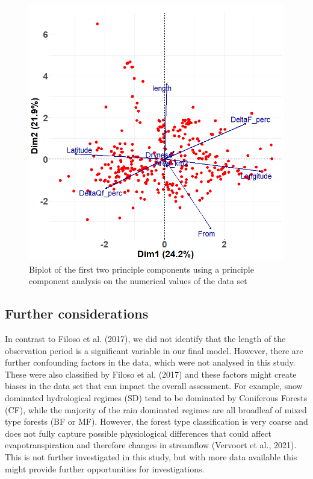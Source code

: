 \documentclass[]{elsarticle} %
\begin{document}
\begin{figure}
\includegraphics[width=0.9\linewidth]{PCA_biplot_Alldata} \caption{Biplot of the first two principle components using a principle component analysis on the numerical values of the data set}\label{fig:pcaplot}
\end{figure}

\hypertarget{further-considerations}{%
\subsection{Further considerations}\label{further-considerations}}

In contrast to Filoso et al. (2017), we did not identify that the length of the observation period is a significant variable in our final model. However, there are further confounding factors in the data, which were not analysed in this study. These were also classified by Filoso et al. (2017) and these factors might create biases in the data set that can impact the overall assessment. For example, snow dominated hydrological regimes (SD) tend to be dominated by Coniferous Forests (CF), while the majority of the rain dominated regimes are all broadleaf of mixed type forests (BF or MF). However, the forest type classification is very coarse and does not fully capture possible physiological differences that could affect evapotranspiration and therefore changes in streamflow (Vervoort et al., 2021). This is not further investigated in this study, but with more data available this might provide further opportunities for investigations.
\end{document}
